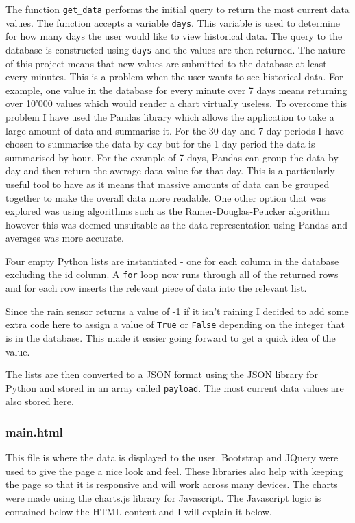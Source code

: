 \documentclass[10pt,a4paper]{article}
\begin{document}
The function \texttt{get\_data} performs the initial query to return the most current data values. The function accepts a variable \texttt{days}. This variable is used to determine for how many days the user would like to view historical data. The query to the database is constructed using \texttt{days} and the values are then returned. The nature of this project means that new values are submitted to the database at least every minutes. This is a problem when the user wants to see historical data. For example, one value in the database for every minute over 7 days means returning over 10'000 values which would render a chart virtually useless. To overcome this problem I have used the Pandas\cite{pandas} library which allows the application to take a large amount of data and summarise it. For the 30 day and 7 day periods I have chosen to summarise the data by day but for the 1 day period the data is summarised by hour. For the example of 7 days, Pandas can group the data by day and then return the average data value for that day. This is a particularly useful tool to have as it means that massive amounts of data can be grouped together to make the overall data more readable. One other option that was explored was using algorithms such as the Ramer-Douglas-Peucker\cite{douglaspeucker} algorithm however this was deemed unsuitable as the data representation using Pandas and averages was more accurate. 

Four empty Python lists are instantiated - one for each column in the database excluding the id column. A \texttt{for} loop now runs through all of the returned rows and for each row inserts the relevant piece of data into the relevant list. 

Since the rain sensor returns a value of -1 if it isn't raining I decided to add some extra code here to assign a value of \texttt{True} or \texttt{False} depending on the integer that is in the database. This made it easier going forward to get a quick idea of the value. 

The lists are then converted to a JSON format using the JSON library for Python and stored in an array called \texttt{payload}. The most current data values are also stored here. 

\subsubsection{main.html}
This file is where the data is displayed to the user. Bootstrap and JQuery were used to give the page a nice look and feel. These libraries also help with keeping the page so that it is responsive and will work across many devices. The charts were made using the charts.js library for Javascript. The Javascript logic is contained below the HTML content and I will explain it below. 
\end{document}

